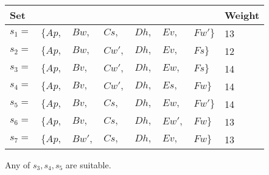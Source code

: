 \documentclass[10pt]{article}
\begin{document}
\begin{enumerate}
\begin{enumerate}
            \begin{tabular}{lllllll|l}
                Set & &&&&&& Weight \\
                \hline
                $s_1=$ & $\{Ap,$ & $Bw,$ & $Cs,$  & $Dh,$ & $Ev,$  & $Fw'\}$ & 13 \\
                $s_2=$ & $\{Ap,$ & $Bw,$ & $Cw',$ & $Dh,$ & $Ev,$  & $ Fs\}$ & 12 \\
                $s_3=$ & $\{Ap,$ & $Bv,$ & $Cw',$ & $Dh,$ & $Ew,$  & $ Fs\}$ & 14 \\
                $s_4=$ & $\{Ap,$ & $Bv,$ & $Cw',$ & $Dh,$ & $Es,$  & $ Fw\}$ & 14 \\
                $s_5=$ & $\{Ap,$ & $Bv,$ & $Cs,$  & $Dh,$ & $Ew,$  & $Fw'\}$ & 14 \\
                $s_6=$ & $\{Ap,$ & $Bv,$ & $Cs,$  & $Dh,$ & $Ew',$ & $ Fw\}$ & 13 \\
                $s_7=$ & $\{Ap,$ & $Bw',$ & $Cs,$ & $Dh,$ & $Ev,$  & $ Fw\}$ & 13 \\
            \end{tabular}

            Any of $s_3,s_4,s_5$ are suitable.
        \end{enumerate}
    \end{enumerate}
\end{document}
